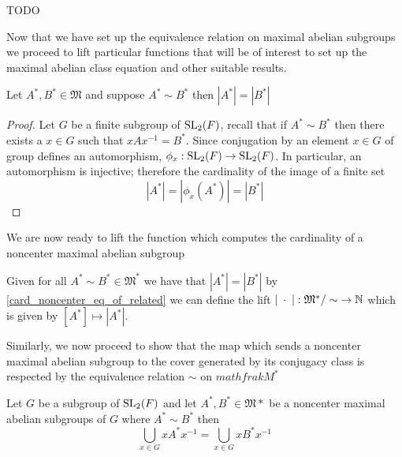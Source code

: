 \begin{remark}
  TODO
\end{remark}

Now that we have set up the equivalence relation on maximal abelian subgroups we proceed to lift particular functions that will be of interest to set up the maximal abelian class equation and 
other suitable results.

\begin{lemma}
  \label{card_noncenter_eq_of_related}
  \leanok
  Let $A^*, B^* \in \mathfrak{M}$ and suppose $A^* \sim B^*$ then $|A^*| = |B^*|$
\end{lemma}
\begin{proof}
  Let $G$ be a finite subgroup of $\operatorname{SL}_2(F)$, recall that if $A^* \sim B^*$ then there exists a $x \in G$ such that $x A x^{-1} = B^*$.
  Since conjugation by an element $x \in G$ of group defines an automorphism, $\phi_x : \operatorname{SL}_2(F) \rightarrow \operatorname{SL}_2(F)$. In particular, an automorphism is injective; 
  therefore the cardinality of the image of a finite set
  \[
  |A^*| = |\phi_x(A^*)| = |B^*|
  \]
\end{proof}

We are now ready to lift the function which computes the cardinality of a noncenter maximal abelian subgroup

\begin{definition}
  \label{lift_card_noncenter}
  \leanok 
  Given for all $A^* \sim B^* \in \mathfrak{M}^*$ we have that $|A^*| = |B^*|$ by \ref{card_noncenter_eq_of_related} we can define the lift
  $|\; \cdot \;| : \mathfrak{M}^* / \sim \; \rightarrow \mathbb{N}$ which is given by $[A^*] \mapsto |A^*|$.
\end{definition}

Similarly, we now proceed to show that the map which sends a noncenter maximal abelian subgroup to the cover generated by its conjugacy class is respected by the equivalence relation $\sim$ on $mathfrak{M}^*$

\begin{lemma}
  \label{noncenter_C_eq_of_related}
  \leanok
  Let $G$ be a subgroup of $\operatorname{SL}_2(F)$ and let $A^* , B^* \in \mathfrak{M}*$ be a noncenter maximal abelian subgroups of $G$ where $A^* \sim B^*$
  then 
  \[
  \bigcup_{x \in G} x A^* x^{-1} = \bigcup_{x \in G} x B^* x^{-1}
  \]
\end{lemma}

